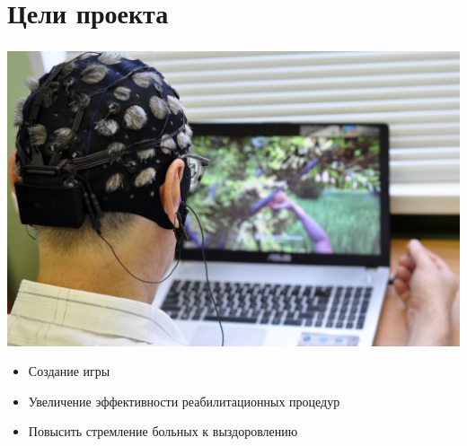 \section{Цели проекта}

\begin{frame}
    \frametitle{\insertsection}
    
    \begin{minipage}[h]{0.4\linewidth}
        \includegraphics[width=\linewidth]{5.jpg}
    \end{minipage}
    \hfill 
    \begin{minipage}[h]{0.5\linewidth}
    \begin{itemize}
        \item Создание игры
        \item Увеличение эффективности реабилитационных процедур
        \item Повысить стремление больных к выздоровлению
    \end{itemize}
    \end{minipage}

\end{frame}